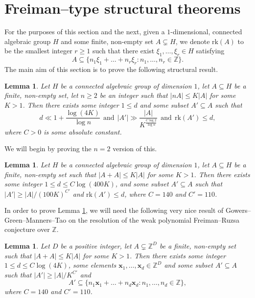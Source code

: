\documentclass[12pt, reqno]{amsart}
\renewcommand{\vec}[1]{\mathbf{#1}}
\newcommand{\rk}{\mathrm{rk}}
\renewcommand{\vec}{\bm}
\newtheorem{lem}[theorem]{Lemma}
\theoremstyle{remark}
\theoremstyle{definition}
\numberwithin{equation}{section}
\begin{document}
\section{Freiman--type structural theorems} \label{addcom}


For the purposes of this section and the next, given a $1$-dimensional, connected algebraic group $H$ and some finite, non-empty set $A \subsetneq H$, we denote $\rk(A)$ to be the smallest integer $r \geq 1$ such that there exist $\xi_1, \dots, \xi_r \in H$ satisfying
\[ A \subseteq \{ n_1 \xi_1 + \dots + n_r \xi_r : n_1, \dots, n_r \in \mathbb{Z} \}. \]
The main aim of this section is to prove the following structural result.



\begin{lem} \label{wpfrlemma2}
        Let $H$ be a connected algebraic group of dimension $1$, let $A \subseteq H$ be a finite, non-empty set, let $n \geq 2$ be an integer such that $|nA| \leq K|A|$ for some $K > 1$. Then there exists some integer $1 \leq d$ and  some subset $A' \subseteq A$ such that 
        \[  d \ll 1+\frac{\log (4K)}{\log n} \ \ \text{and}  \ \ |A'| \gg \frac{|A|}{K^{\frac{C\log 2}{ \log n}}} \ \ \text{and} \ \  \rk(A') \leq d, \]
        where $C>0$ is some absolute constant.
\end{lem}

We will begin by proving the $n=2$ version of this. 

\begin{lem} \label{wpfrlemma}
        Let $H$ be a connected algebraic group of dimension $1$, let $A \subseteq H$ be a finite, non-empty set such that $|A+A| \leq K|A|$ for some $K > 1$. Then there exists some integer $1 \leq d \leq C\log (400K)$,  and some subset $A' \subseteq A$ such that $|A'| \geq |A|/(100K)^{C'}$ and $\rk(A') \leq d$,  where $C = 140$ and $C' = 110$.
\end{lem}




In order to prove Lemma \ref{wpfrlemma}, we will need the following very nice result of Gowers--Green--Manners--Tao \cite[Theorem 1.3]{GGMT2025} on the resolution of the weak polynomial Freiman--Ruzsa conjecture over $\mathbb{Z}$.

\begin{lem} \label{wpfr}
Let $D$ be a positive integer, let $A \subsetneq \mathbb{Z}^D$ be a finite, non-empty set such that $|A+A| \leq K|A|$ for some $K >1$. Then there exists some integer $1 \leq d \leq C \log (4K)$, some elements $\vec{x}_1, \dots, \vec{x}_d \in \mathbb{Z}^D$ and some subset $A' \subseteq A$ such that $|A'| \geq |A|/K^{C'}$ and 
\[ A' \subseteq \{ n_1 \vec{x}_1 + \dots + n_d \vec{x}_d : n_1, \dots, n_d \in \mathbb{Z}\}, \]
where $C = 140$ and $C' = 110$.
\end{lem}
\end{document}
